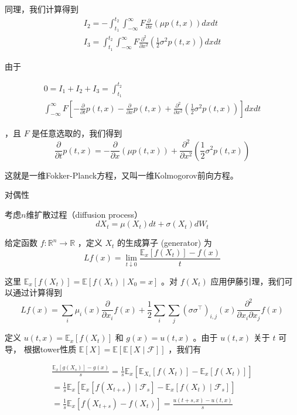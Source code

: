 \documentclass[lang=cn,newtx,10pt,scheme=chinese]{elegantbook}
\begin{document}
同理，我们计算得到
$$
\begin{gathered}
I_2=-\int_{t_1}^{t_2} \int_{-\infty}^{\infty} F \frac{\partial}{\partial x}(\mu p(t, x)) d x d t \\
I_3=\int_{t_1}^{t_2} \int_{-\infty}^{\infty} F \frac{\partial^2}{\partial x^2}\left(\frac{1}{2} \sigma^2 p(t, x)\right) d x d t
\end{gathered}
$$

由于

$$
\begin{gathered}
0=I_1+I_2+I_3=\int_{t_1}^{t_2} \\
\int_{-\infty}^{\infty} F\left[-\frac{\partial}{\partial t} p(t, x)-\frac{\partial}{\partial x} 
p(t, x)+\frac{\partial^2}{\partial x^2}\left(\frac{1}{2} \sigma^2 p(t, x)\right)\right] d x d t
\end{gathered}
$$

，且 $F$ 是任意选取的，我们得到
$$
\frac{\partial}{\partial t} p(t, x)=-\frac{\partial}{\partial x}(\mu p(t, x))+\frac{\partial^2}{\partial x^2}\left(\frac{1}{2} \sigma^2 p(t, x)\right)
$$

这就是一维Fokker-Planck方程，又叫一维Kolmogorov前向方程。

对偶性

考虑$n$维扩散过程（diffusion process）
$$
d X_t=\mu\left(X_t\right) d t+\sigma\left(X_t\right) d W_t
$$

给定函数 $f: \mathbb{R}^n \rightarrow \mathbb{R}$ ，定义 $X_t$ 的生成算子 (generator) 为
$$
L f(x)=\lim _{t \downarrow 0} \frac{\mathbb{E}_x\left[f\left(X_t\right)\right]-f(x)}{t}
$$

这里 $\mathbb{E}_x\left[f\left(X_t\right)\right]=\mathbb{E}\left[f\left(X_t\right) \mid X_0=x\right]$ 。对 $f\left(X_t\right)$ 
应用伊藤引理，我们可以通过计算得到
$$
L f(x)=\sum_i \mu_i(x) \frac{\partial}{\partial x_i} f(x)+\frac{1}{2} \sum_i \sum_j\left(\sigma \sigma^{\top}\right)_{i, j}(x) \frac{\partial^2}{\partial x_i \partial x_j} f(x)
$$

定义 $u(t, x)=\mathbb{E}_x\left[f\left(X_t\right)\right]$ 和 $g(x)=u(t, x)$ 。由于 $u(t, x)$ 关于 $t$ 可导，
根据tower性质 $\mathbb{E}[X]=\mathbb{E}[\mathbb{E}[X \mid \mathcal{F}]]$ ，我们有

$$
\begin{gathered}
\frac{\mathbb{E}_x\left[g\left(X_s\right)\right]-g(x)}{s}=\frac{1}{s} \mathbb{E}_x\left[\mathbb{E}_{X_s}\left[f\left(X_t\right)\right]-\mathbb{E}_x\left[f\left(X_t\right)\right]\right] \\
=\frac{1}{s} \mathbb{E}_x\left[\mathbb{E}_x\left[f\left(X_{t+s}\right) \mid \mathcal{F}_s\right]-\mathbb{E}_x\left[f\left(X_t\right) \mid \mathcal{F}_s\right]\right] \\
=\frac{1}{s} \mathbb{E}_x\left[f\left(X_{t+s}\right)-f\left(X_t\right)\right]=\frac{u(t+s, x)-u(t, x)}{s}
\end{gathered}
$$
\end{document}
